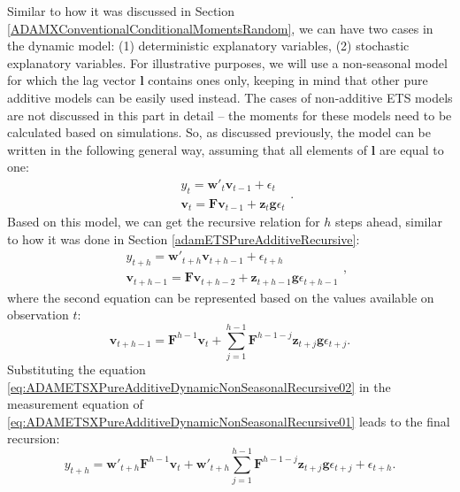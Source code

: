 \documentclass[]{book}
\theoremstyle{definition}
\theoremstyle{definition}
\theoremstyle{definition}
\theoremstyle{definition}
\theoremstyle{remark}
\begin{document}
Similar to how it was discussed in Section \ref{ADAMXConventionalConditionalMomentsRandom}, we can have two cases in the dynamic model: (1) deterministic explanatory variables, (2) stochastic explanatory variables. For illustrative purposes, we will use a non-seasonal model for which the lag vector \(\mathbf{l}\) contains ones only, keeping in mind that other pure additive models can be easily used instead. The cases of non-additive ETS models are not discussed in this part in detail -- the moments for these models need to be calculated based on simulations. So, as discussed previously, the model can be written in the following general way, assuming that all elements of \(\mathbf{l}\) are equal to one:
\begin{equation}
  \begin{aligned}
    & {y}_{t} = \mathbf{w}'_t \mathbf{v}_{t-1} + \epsilon_t \\
    & \mathbf{v}_t = \mathbf{F} \mathbf{v}_{t-1} + \mathbf{z}_t \mathbf{g} \epsilon_t
  \end{aligned} .
  \label{eq:ADAMETSXPureAdditiveDynamicNonSeasonal}
\end{equation}
Based on this model, we can get the recursive relation for \(h\) steps ahead, similar to how it was done in Section \ref{adamETSPureAdditiveRecursive}:
\begin{equation}
  \begin{aligned}
    & {y}_{t+h} = \mathbf{w}'_{t+h} \mathbf{v}_{t+h-1} + \epsilon_{t+h} \\
    & \mathbf{v}_{t+h-1} = \mathbf{F} \mathbf{v}_{t+h-2} + \mathbf{z}_{t+h-1} \mathbf{g} \epsilon_{t+h-1}
  \end{aligned} ,
  \label{eq:ADAMETSXPureAdditiveDynamicNonSeasonalRecursive01}
\end{equation}
where the second equation can be represented based on the values available on observation \(t\):
\begin{equation}
  \mathbf{v}_{t+h-1} = \mathbf{F}^{h-1} \mathbf{v}_{t} + \sum_{j=1}^{h-1} \mathbf{F}^{h-1-j} \mathbf{z}_{t+j} \mathbf{g} \epsilon_{t+j} .
  \label{eq:ADAMETSXPureAdditiveDynamicNonSeasonalRecursive02}
\end{equation}
Substituting the equation \eqref{eq:ADAMETSXPureAdditiveDynamicNonSeasonalRecursive02} in the measurement equation of \eqref{eq:ADAMETSXPureAdditiveDynamicNonSeasonalRecursive01} leads to the final recursion:
\begin{equation}
    {y}_{t+h} = \mathbf{w}'_{t+h} \mathbf{F}^{h-1} \mathbf{v}_{t} + \mathbf{w}'_{t+h} \sum_{j=1}^{h-1} \mathbf{F}^{h-1-j} \mathbf{z}_{t+j} \mathbf{g} \epsilon_{t+j} + \epsilon_{t+h} .
  \label{eq:ADAMETSXPureAdditiveDynamicNonSeasonalRecursiveFinal}
\end{equation}
\end{document}
